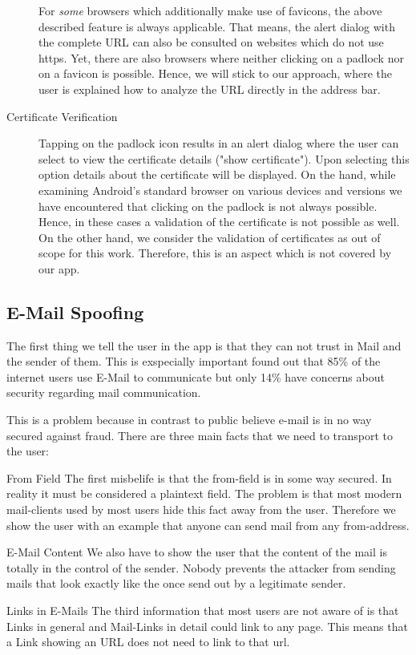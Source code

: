 \begin{description}
For \textit{some} browsers which additionally make use of favicons, the above described feature is always applicable.
That means, the alert dialog with the complete URL can also be consulted on websites which do not use https.
Yet, there are also browsers where neither clicking on a padlock nor on a favicon is possible.
Hence, we will stick to our approach, where the user is explained how to analyze the URL directly in the address bar.
		\item[Certificate Verification]Tapping on the padlock icon results in an alert dialog where the user can select to view the certificate details ("show certificate").
Upon selecting this option details about the certificate will be displayed.
On the hand, while examining Android's standard browser on various devices and versions we have encountered that clicking on the padlock is not always possible. 
Hence, in these cases a validation of the certificate is not possible as well.
On the other hand, we consider the validation of certificates as out of scope for this work.
Therefore, this is an aspect which is not covered by our app.

\end{description}

\subsection{E-Mail Spoofing}
The first thing we tell the user in the app is that they can not trust in Mail and the sender of them.
This is exspecially important \cite{divsi2012divsi} found out that 85\% of the internet users use E-Mail to communicate but only 14\% have concerns about security regarding mail communication.

This is a problem because in contrast to public believe e-mail is in no way secured against fraud. There are three main facts that we need to transport to the user:
\begin{description}
	\item{From Field} The first misbelife is that the from-field is in some way secured.
	In reality it must be considered a plaintext field.
	The problem is that most modern mail-clients used by most users hide this fact away from the user.
	Therefore we show the user with an example that anyone can send mail from any from-address.
	\item{E-Mail Content} We also have to show the user that the content of the mail is totally in the control of the sender.
	Nobody prevents the attacker from sending mails that look exactly like the once send out by a legitimate sender.
	\item{Links in E-Mails} The third information that most users are not aware of is that Links in general and Mail-Links in detail could link to any page. This means that a Link showing an URL does not need to link to that url.
\end{description}

